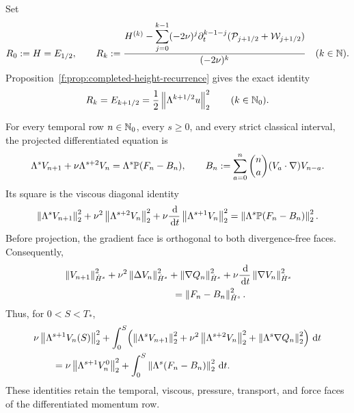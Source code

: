 \begin{definition}
\label{f:def:completed-critical-height-coordinates}
Set
\begin{equation}
 R_0:=H=E_{1/2},
 \qquad
 R_k
 :=\frac{H^{(k)}-
   \displaystyle\sum_{j=0}^{k-1}(-2\nu)^j
   \partial_t^{k-1-j}(\mathcal P_{j+1/2}+\mathcal W_{j+1/2})}
 {(-2\nu)^k}
 \quad(k\in\mathbb N).
 \label{f:eq:completed-critical-coordinate}
\end{equation}
Proposition~\ref{f:prop:completed-height-recurrence} gives the exact identity
\begin{equation}
 R_k=E_{k+1/2}
 =\frac12\left\lVert \Lambda^{k+1/2}u\right\rVert_2^2
 \qquad(k\in\mathbb N_0).
 \label{f:eq:completed-critical-coordinate-identity}
\end{equation}
\par
\end{definition}

\begin{proposition}
\label{f:prop:complete-forced-rectangle-cell}
For every temporal row \(n\in\mathbb N_0\), every \(s\ge0\), and every strict
classical interval, the projected differentiated equation is
\begin{equation}
 \Lambda^sV_{n+1}+\nu\Lambda^{s+2}V_n
 =\Lambda^s\mathbb P(F_n-B_n),
 \qquad
 B_n:=\sum_{a=0}^n\binom na(V_a\cdot\nabla)V_{n-a}.
 \label{f:eq:complete-forced-rectangle-cell}
\end{equation}
Its square is the viscous diagonal identity
\begin{equation}
 \left\lVert \Lambda^sV_{n+1}\right\rVert_2^2
 +\nu^2\left\lVert \Lambda^{s+2}V_n\right\rVert_2^2
 +\nu\frac{\,\mathrm d}{\,\mathrm d t}\left\lVert \Lambda^{s+1}V_n\right\rVert_2^2
 =\left\lVert \Lambda^s\mathbb P(F_n-B_n)\right\rVert_2^2.
 \label{f:eq:complete-forced-rectangle-square}
\end{equation}
Before projection, the gradient face is orthogonal to both divergence-free
faces.  Consequently,
\begin{align}
 &\norm{V_{n+1}}_{\dot H^s}^2
 +\nu^2\norm{\Delta V_n}_{\dot H^s}^2
 +\norm{\nabla Q_n}_{\dot H^s}^2
 +\nu\frac{\dd}{\dd t}\norm{\nabla V_n}_{\dot H^s}^2
 \notag\\
 &\hspace{4cm}=\norm{F_n-B_n}_{\dot H^s}^2.
 \label{f:eq:complete-forced-pressure-square}
\end{align}
Thus, for \(0<S<T_*\),
\begin{align}
 &\nu\left\lVert \Lambda^{s+1}V_n(S)\right\rVert_2^2
 +\int_0^S\!\left(
   \left\lVert \Lambda^sV_{n+1}\right\rVert_2^2
   +\nu^2\left\lVert \Lambda^{s+2}V_n\right\rVert_2^2
   +\left\lVert \Lambda^s\nabla Q_n\right\rVert_2^2\right)\,\mathrm d t
 \notag\\
 &\qquad=
 \nu\left\lVert \Lambda^{s+1}V_n^0\right\rVert_2^2
 +\int_0^S\left\lVert \Lambda^s(F_n-B_n)\right\rVert_2^2\,\mathrm d t.
 \label{f:eq:complete-forced-rectangle-integrated}
\end{align}
These identities retain the temporal, viscous, pressure, transport, and force
faces of the differentiated momentum row.
\end{proposition}

